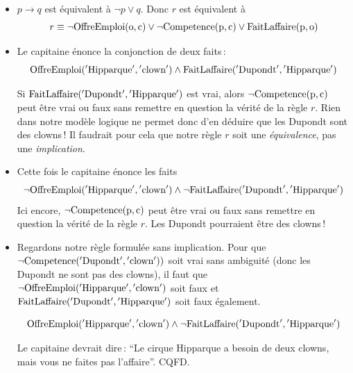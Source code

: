 \begin{solution}
\begin{itemize}
  \item $p \to q$ est équivalent à $\neg p \lor q$. Donc $r$ est équivalent
     à 
     $$r \equiv \neg \rm{OffreEmploi} (o,c) \lor \neg \rm{Competence} (p,c) \lor \rm{FaitLaffaire} (p,o)$$
     
  \item Le capitaine énonce la conjonction de deux faits\,: 
   $$\rm{OffreEmploi} (\rm{'Hipparque'}, \rm{'clown'}) \land 
    \rm{FaitLaffaire} (\rm{'Dupondt'}, \rm{'Hipparque'})$$
    
     Si $\rm{FaitLaffaire} (\rm{'Dupondt'}, \rm{'Hipparque'})$ est vrai,
     alors $\neg \rm{Competence} (p,c)$ peut être vrai ou 
     faux sans remettre en question la vérité de la règle $r$.  Rien dans notre
    modèle logique ne permet donc d'en déduire
    que les Dupondt sont des clowns\,! Il faudrait pour cela que notre règle 
    $r$ soit une \emph{équivalence}, pas une \emph{implication}. 
    
  \item Cette fois le capitaine énonce les faits\, 
      $$\neg \rm{OffreEmploi} (\rm{'Hipparque'}, \rm{'clown'}) \land 
      \neg \rm{FaitLaffaire} (\rm{'Dupondt'}, \rm{'Hipparque'})$$
      Ici encore, $\neg \rm{Competence} (p,c)$ peut être vrai ou 
     faux sans remettre en question la vérité de la règle $r$. Les Dupondt pourraient
     être des clowns\,!
     
     \item Regardons notre règle formulée sans implication. Pour
     que $\neg \rm{Competence} (\rm{'Dupondt'},\rm{'clown'}))$ soit vrai sans ambiguité
     (donc les Dupondt ne sont pas des clowns),
     il faut que $\neg \rm{OffreEmploi}(\rm{'Hipparque'},\rm{'clown'})$ soit faux et 
     $\rm{FaitLaffaire} (\rm{'Dupondt'},\rm{'Hipparque'})$ soit faux également.
     
     $$ \rm{OffreEmploi}(\rm{'Hipparque'},\rm{'clown'}) \land \neg \rm{FaitLaffaire} (\rm{'Dupondt'},\rm{'Hipparque'})$$
    
     Le capitaine devrait dire\,: ``Le cirque Hipparque a besoin de deux clowns,
     mais vous ne faites pas l'affaire''. CQFD. 
       
   
\end{itemize}

\end{solution}



